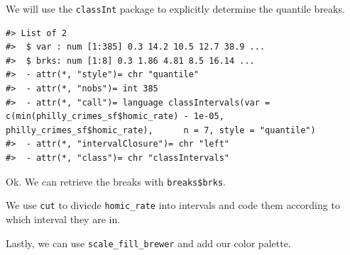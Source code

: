 \documentclass[
]{book}
\newenvironment{Shaded}{\begin{snugshade}}{\end{snugshade}}
\newcommand{\AttributeTok}[1]{\textcolor[rgb]{0.13,0.29,0.53}{#1}}
\newcommand{\CommentTok}[1]{\textcolor[rgb]{0.56,0.35,0.01}{\textit{#1}}}
\newcommand{\DecValTok}[1]{\textcolor[rgb]{0.00,0.00,0.81}{#1}}
\newcommand{\FunctionTok}[1]{\textcolor[rgb]{0.13,0.29,0.53}{\textbf{#1}}}
\newcommand{\NormalTok}[1]{#1}
\newcommand{\OtherTok}[1]{\textcolor[rgb]{0.56,0.35,0.01}{#1}}
\newcommand{\SpecialCharTok}[1]{\textcolor[rgb]{0.81,0.36,0.00}{\textbf{#1}}}
\newcommand{\StringTok}[1]{\textcolor[rgb]{0.31,0.60,0.02}{#1}}
\begin{document}
We will use the \texttt{classInt} package to explicitly determine the quantile breaks.

\begin{Shaded}
\end{Shaded}

\begin{verbatim}
#> List of 2
#>  $ var : num [1:385] 0.3 14.2 10.5 12.7 38.9 ...
#>  $ brks: num [1:8] 0.3 1.86 4.81 8.5 16.14 ...
#>  - attr(*, "style")= chr "quantile"
#>  - attr(*, "nobs")= int 385
#>  - attr(*, "call")= language classIntervals(var = c(min(philly_crimes_sf$homic_rate) - 1e-05, philly_crimes_sf$homic_rate),      n = 7, style = "quantile")
#>  - attr(*, "intervalClosure")= chr "left"
#>  - attr(*, "class")= chr "classIntervals"
\end{verbatim}

Ok. We can retrieve the breaks with \texttt{breaks\$brks}.

We use \texttt{cut} to divicde \texttt{homic\_rate} into intervals and code them according to which interval they are in.

Lastly, we can use \texttt{scale\_fill\_brewer} and add our color palette.

\begin{Shaded}
\end{Shaded}
\end{document}
